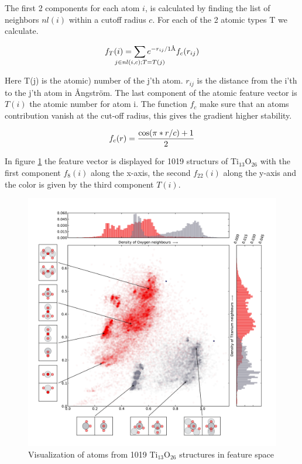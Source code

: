 \documentclass[%
 aps,
 prl,%
 amsmath,amssymb,
 reprint,%
]{revtex4-1}
\begin{document}
The first 2 components for each atom $i$, is calculated by finding the list of neighbors $nl(i)$ within a cutoff radius $c$. For each of the 2 atomic types T we calculate. 

\begin{equation}
f_T(i) = \sum_{\mathclap{j \in nl(i,c);T=T(j)}} e^{-r_{ij}/1\text{\AA}}f_c(r_{ij})  \label{eq1}
\end{equation}

Here T(j) is the atomic) number of the j'th atom. $r_{ij}$ is the distance from the i'th to the j'th atom in {\AA}ngstr\"{o}m. The last component of the atomic feature vector is $T(i)$ the atomic number for atom i. 
The function $f_c$ make sure that an atoms contribution vanish at the cut-off radius, this gives the gradient higher stability.

\begin{equation}
f_c(r)={{\cos(\pi*r/c)+1}\over 2}
\end{equation}



In figure \ref{fig1} the feature vector is displayed for 1019 structurs of Ti$_{13}$O$_{26}$ with the first component $f_8(i)$ along the x-axis, the second $f_{22}(i)$ along the y-axis and the color is given by the third component $T(i)$. 


\begin{figure}[h]
    \centering
    \includegraphics[width=1.0\columnwidth]{fig1-scatterplot.pdf}
    \caption{Visualization of atoms from 1019 Ti$_{13}$O$_{26}$ structures in feature space}
    \label{fig1}
\end{figure}
\end{document}
